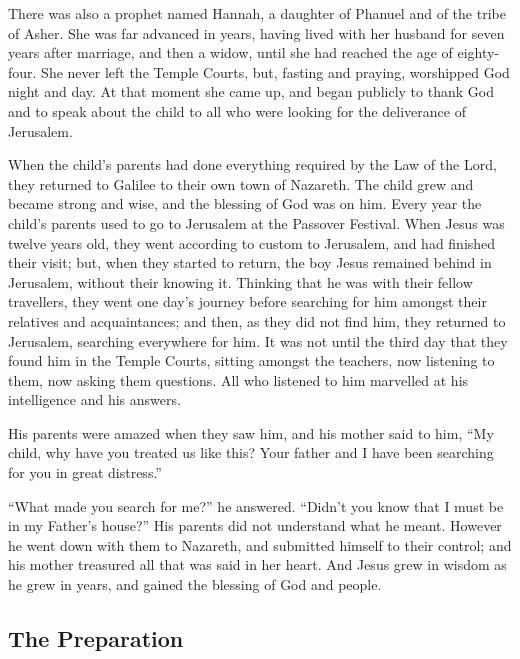  There was also a prophet named Hannah, a daughter of
Phanuel and of the tribe of Asher. She was far advanced in years, having
lived with her husband for seven years after marriage,  and
then a widow, until she had reached the age of eighty-four. She never
left the Temple Courts, but, fasting and praying, worshipped God night
and day.  At that moment she came up, and began publicly to
thank God and to speak about the child to all who were looking for the
deliverance of Jerusalem.

 When the child's parents had done everything required by
the Law of the Lord, they returned to Galilee to their own town of
Nazareth.  The child grew and became strong and wise, and
the blessing of God was on him.  Every year the child's
parents used to go to Jerusalem at the Passover Festival. 
When Jesus was twelve years old, they went according to custom to
Jerusalem,  and had finished their visit; but, when they
started to return, the boy Jesus remained behind in Jerusalem, without
their knowing it.  Thinking that he was with their fellow
travellers, they went one day's journey before searching for him amongst
their relatives and acquaintances;  and then, as they did
not find him, they returned to Jerusalem, searching everywhere for him.
 It was not until the third day that they found him in the
Temple Courts, sitting amongst the teachers, now listening to them, now
asking them questions.  All who listened to him marvelled
at his intelligence and his answers.

 His parents were amazed when they saw him, and his mother
said to him, ``My child, why have you treated us like this? Your father
and I have been searching for you in great distress.''

 ``What made you search for me?'' he answered. ``Didn't you
know that I must be in my Father's house?''  His parents
did not understand what he meant.  However he went down
with them to Nazareth, and submitted himself to their control; and his
mother treasured all that was said in her heart.  And Jesus
grew in wisdom as he grew in years, and gained the blessing of God and
people.

\hypertarget{the-preparation}{%
\subsection{The Preparation}\label{the-preparation}}


